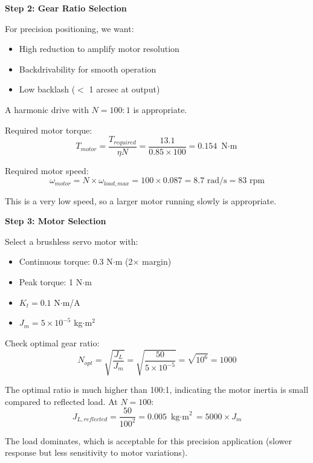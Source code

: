 \textbf{Step 2: Gear Ratio Selection}

For precision positioning, we want:
\begin{itemize}
    \item High reduction to amplify motor resolution
    \item Backdrivability for smooth operation
    \item Low backlash ($<$ 1 arcsec at output)
\end{itemize}

A harmonic drive with $N = 100:1$ is appropriate.

Required motor torque:
\begin{equation}
    T_{motor} = \frac{T_{required}}{\eta N} = \frac{13.1}{0.85 \times 100} = 0.154 \text{ N$\cdot$m}
\end{equation}

Required motor speed:
\begin{equation}
    \omega_{motor} = N \times \omega_{load,max} = 100 \times 0.087 = 8.7 \text{ rad/s} = 83 \text{ rpm}
\end{equation}

This is a very low speed, so a larger motor running slowly is appropriate.

\textbf{Step 3: Motor Selection}

Select a brushless servo motor with:
\begin{itemize}
    \item Continuous torque: 0.3 N$\cdot$m (2$\times$ margin)
    \item Peak torque: 1 N$\cdot$m
    \item $K_t = 0.1$ N$\cdot$m/A
    \item $J_m = 5 \times 10^{-5}$ kg$\cdot$m$^2$
\end{itemize}

Check optimal gear ratio:
\begin{equation}
    N_{opt} = \sqrt{\frac{J_L}{J_m}} = \sqrt{\frac{50}{5 \times 10^{-5}}} = \sqrt{10^6} = 1000
\end{equation}

The optimal ratio is much higher than 100:1, indicating the motor inertia is small compared to reflected load. At $N = 100$:
\begin{equation}
    J_{L,reflected} = \frac{50}{100^2} = 0.005 \text{ kg$\cdot$m}^2 = 5000 \times J_m
\end{equation}

The load dominates, which is acceptable for this precision application (slower response but less sensitivity to motor variations).

